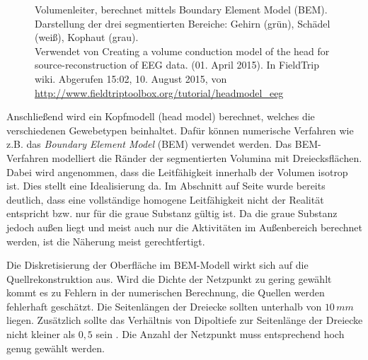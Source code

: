 \documentclass[doc,a4paper,12pt]{apa6}
\makeatletter
\DeclareRobustCommand*{\nameref}[1]{%
      \glqq{\myorg@nameref{#1}}\grqq%
    }%
\makeatother
\begin{document}
\begin{figure}[t]
  \centering
  \vspace*{3mm}
  \caption[Volumenleiter, berechnet mittels Boundary Element Model (BEM)]{Volumenleiter, berechnet mittels Boundary Element Model (BEM). Darstellung der drei segmentierten Bereiche: Gehirn (grün), Schädel (weiß), Kophaut (grau).\\ Verwendet von \glqq Creating a volume conduction model of the head for source-reconstruction of EEG data\grqq . (01. April 2015). In FieldTrip wiki. Abgerufen 15:02, 10. August 2015, von \url{http://www.fieldtriptoolbox.org/tutorial/headmodel_eeg}}
  \label{img:bem}
\end{figure}

Anschließend wird ein Kopfmodell (head model) berechnet, welches die verschiedenen Gewebetypen beinhaltet. Dafür können numerische Verfahren wie z.B. das \emph{Boundary Element Model} (BEM) verwendet werden. Das BEM-Verfahren modelliert die Ränder der segmentierten Volumina mit Dreiecksflächen. Dabei wird angenommen, dass die Leitfähigkeit innerhalb der Volumen isotrop ist. Dies stellt eine Idealisierung da. Im Abschnitt \nameref{sec:head-struct} auf Seite \pageref{sec:head-struct} wurde bereits deutlich, dass eine vollständige homogene Leitfähigkeit nicht der Realität entspricht bzw. nur für die graue Substanz gültig ist. Da die graue Substanz jedoch außen liegt und meist auch nur die Aktivitäten im Außenbereich berechnet werden, ist die Näherung meist gerechtfertigt.

Die Diskretisierung der Oberfläche im BEM-Modell wirkt sich auf die Quellrekonstruktion aus. Wird die Dichte der Netzpunkt zu gering gewählt kommt es zu Fehlern in der numerischen Berechnung, die Quellen werden fehlerhaft geschätzt. Die Seitenlängen der Dreiecke sollten unterhalb von $10\,mm$ liegen. Zusätzlich sollte das Verhältnis von Dipoltiefe zur Seitenlänge der Dreiecke nicht kleiner als $0,5$ sein \parencite{haueisen1997effect}. Die Anzahl der Netzpunkt muss entsprechend hoch genug gewählt werden.
\end{document}
